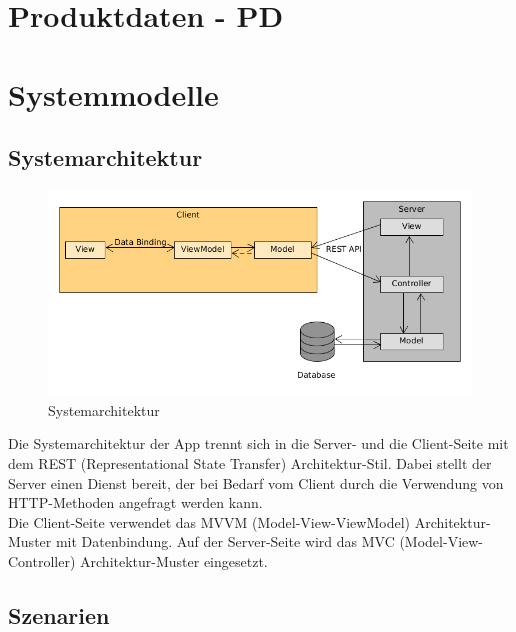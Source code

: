 \documentclass[a4paper]{scrreprt}
\begin{document}
    \chapter{Produktdaten - PD}
    
		
    
    \chapter{Systemmodelle}
    
    	\section{Systemarchitektur}
    	
    	\begin{figure}[H]
    		\centering
    		\includegraphics[scale = .6]{systemarchitektur.png}
    		\caption{Systemarchitektur}
    	\end{figure}
    
    	Die Systemarchitektur der App trennt sich in die Server- und die Client-Seite mit dem REST (Representational State Transfer) Architektur-Stil. Dabei stellt der Server einen Dienst bereit, der bei Bedarf vom Client durch die Verwendung von HTTP-Methoden angefragt werden kann. \\
    	Die Client-Seite verwendet das MVVM (Model-View-ViewModel) Architektur-Muster mit Datenbindung. Auf der Server-Seite wird das MVC (Model-View-Controller) Architektur-Muster eingesetzt.
    	
    
    	\clearpage
    		
        \section{Szenarien}
        
        
\end{document}
